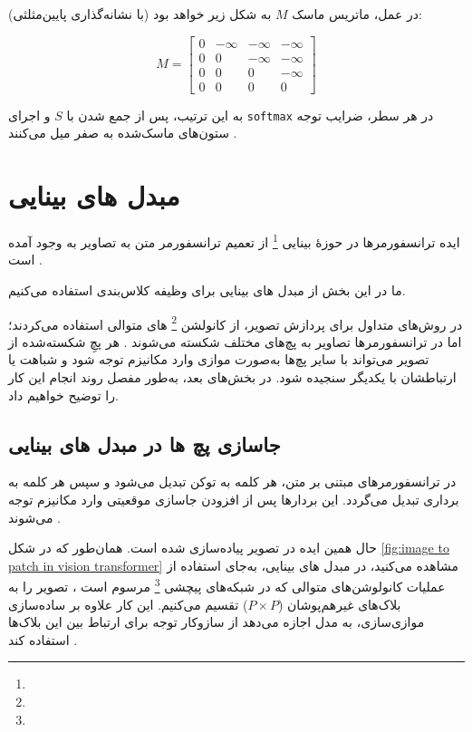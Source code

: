 در عمل، ماتریس ماسک \( M \) به شکل زیر خواهد بود (با نشانه‌گذاری پایین‌مثلثی):


\[
M =
\begin{bmatrix}
	0 & -\infty & -\infty & -\infty \\
	0 & 0 & -\infty & -\infty \\
	0 & 0 & 0 & -\infty \\
	0 & 0 & 0 & 0
\end{bmatrix}
\]

به این ترتیب، پس از جمع شدن با \( S \) و اجرای \texttt{softmax} در هر سطر، ضرایب توجه ستون‌های ماسک‌شده به صفر میل می‌کنند \cite{vaswani2017attention}.

 
\section{مبدل های بینایی}

ایده ترانسفورمرها در حوزهٔ بینایی \footnote{} از تعمیم ترانسفورمر متن به تصاویر به وجود آمده است \cite{dosovitskiy2020image}.

ما در این بخش از مبدل های بینایی برای وظیفه کلاس‌بندی استفاده می‌کنیم.

در روش‌های متداول برای پردازش تصویر، از کانولشن \footnote{} ‌های متوالی استفاده می‌کردند؛ اما در ترانسفورمرها تصاویر به پچ‌های مختلف شکسته می‌شوند \cite{dosovitskiy2020image}. هر پچِ شکسته‌شده از تصویر می‌تواند با سایر پچ‌ها به‌صورت موازی وارد مکانیزم توجه  شود و شباهت یا ارتباطشان با یکدیگر سنجیده شود. در بخش‌های بعد، به‌طور مفصل روند انجام این کار را توضیح خواهیم داد.


\subsection{جاسازی پچ ها در مبدل های بینایی}
در ترانسفورمرهای مبتنی بر متن، هر کلمه به توکن تبدیل می‌شود و سپس هر کلمه به برداری تبدیل می‌گردد. این بردارها پس از افزودن جاسازی موقعیتی وارد مکانیزم توجه می‌شوند \cite{vaswani2017attention}. 

حال همین ایده در تصویر پیاده‌سازی شده است. همان‌طور که در شکل \ref{fig:image to patch in vision transformer} مشاهده می‌کنید، در مبدل های بینایی، به‌جای استفاده از عملیات کانولوشن‌های متوالی که در شبکه‌های پیچشی \footnote{} مرسوم است \cite{lecun1998gradient,krizhevsky2012imagenet,he2016deep}، تصویر را به بلاک‌های غیرهم‌پوشان (\(P \times P\)) تقسیم می‌کنیم. این کار علاوه بر ساده‌سازی موازی‌سازی، به مدل اجازه می‌دهد از سازوکار توجه برای ارتباط بین این بلاک‌ها استفاده کند \cite{dosovitskiy2020image}.

